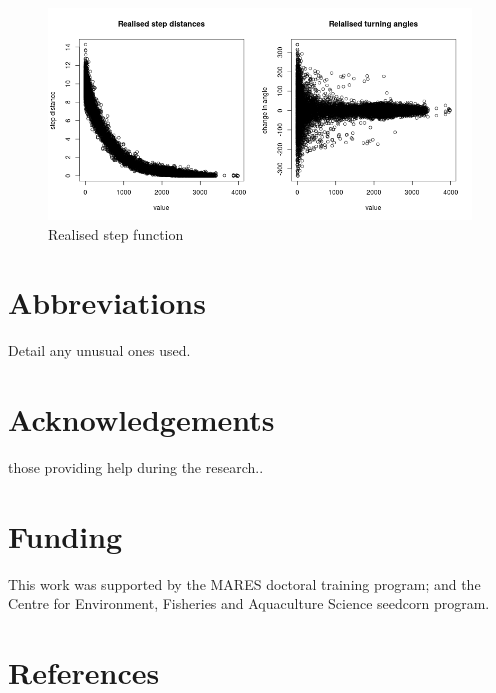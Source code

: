 \documentclass[review]{elsarticle}
\begin{document}
\begin{figure}[!ht]
	\includegraphics[width = \linewidth]{../tests/plots/step_function}
	\caption{Realised step function}
	\label{fig:12}
\end{figure}	





\newpage

\section*{Abbreviations} Detail any unusual ones used.

\section*{Acknowledgements} those providing help during the research..

\section*{Funding} This work was supported by the MARES doctoral training
program; and the Centre for Environment, Fisheries and Aquaculture Science
seedcorn program.

\newpage

\section*{References}


\end{document}
